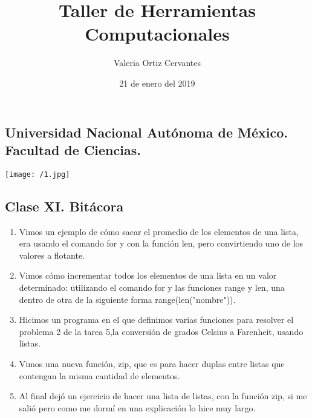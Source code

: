 \documentclass{article} %
\title{\Huge Taller de Herramientas Computacionales}
\author{Valeria Ortiz Cervantes}
\date{21 de enero del 2019}
\begin{document}
	\maketitle
	\begin{center}
		\subsection*{Universidad Nacional Autónoma de México.\\Facultad de Ciencias.\\}
		\texttt{[image: /1.jpg]}
	\end{center}
	\newpage
	\subsection*{Clase XI. Bitácora\\}
	\begin{enumerate}
		\item Vimos un ejemplo de cómo sacar el promedio de los elementos de una lista, era usando el comando for y con la función len, pero convirtiendo uno de los valores a flotante. 
		\item Vimos cómo incrementar todos los elementos de una lista en un valor determinado: utilizando el comando for y las funciones range y len, una dentro de otra de la siguiente forma range(len("nombre")).
		\item Hicimos un programa en el que definimos varias funciones para resolver el problema 2 de la tarea 5,la conversión de grados Celsius a Farenheit, usando listas.
		\item Vimos una nueva función, zip, que es para hacer duplas entre listas que contengan la misma cantidad de elementos.
		\item Al final dejó un ejercicio de hacer una lista de listas, con la función zip, si me salió pero como me dormí en una explicación lo hice muy largo.
	\end{enumerate}
\end{document}
